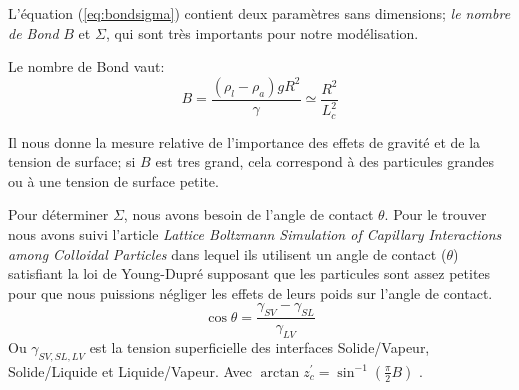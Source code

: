 
        L'équation (\ref{eq:bondsigma}) contient deux paramètres sans dimensions; \textit{le nombre de Bond} $B$ et $\Sigma$, qui sont très importants pour notre modélisation.

        Le nombre de Bond vaut:
        \begin{equation}
            B = \frac{(\rho_l-\rho_{a})gR^2}{\gamma} \simeq \frac{R^2}{L_c^2}
        \end{equation}

        Il nous donne la mesure relative de l'importance des effets de gravité et de la tension de surface; si $B$ est tres grand, cela correspond à des particules grandes ou à une tension de surface petite. 

        Pour déterminer $\Sigma$, nous avons besoin de l'angle de contact $\theta$. Pour le trouver nous avons suivi l'article \textit{Lattice Boltzmann Simulation of Capillary Interactions among Colloidal Particles}\cite{lattice_boltzmann_caplilary_interaction} dans lequel ils utilisent un angle de contact ($\theta$) satisfiant la loi de Young-Dupré supposant que les particules sont assez petites pour que nous puissions négliger les effets de leurs poids sur l'angle de contact. %
        \begin{equation}
            \cos \theta = \frac{\gamma_{SV}-\gamma_{SL}}{\gamma_{LV}}
            \label{eq:cos_angle_contact}
        \end{equation}
        Ou $\gamma_{SV,SL,LV}$ est la tension superficielle des interfaces Solide/Vapeur, Solide/Liquide et Liquide/Vapeur.
        Avec $\arctan z_c^{'} = \sin^{-1}\left(\frac{\pi}{2}B\right)$ \cite{lattice_boltzmann_caplilary_interaction}. 
        
